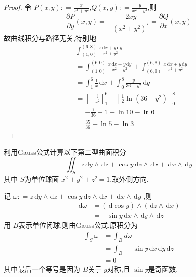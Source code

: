 \documentclass[lang=cn,12pt,color=green,fontset=none,thmcnt=section]{elegantbook}
\begin{document}
\begin{proof}
    令 $ P \left( x,y \right): = \frac{x }{x^{2}+ y^{2} }   $,$ Q \left( x,y \right): = \frac{y }{x^{2}+ y^{2} }   $,则 $$
    \frac{\partial P}{\partial y}\left( x,y \right) =  - \frac{2xy}{\left( x^{2}+ y^{2} \right)^{2} }   = \frac{\partial Q}{\partial x} \left( x,y \right)$$
    故曲线积分与路径无关,特别地 $$
    \begin{aligned}
    &\int_{\left( 1,0 \right) }^{\left( 6,8 \right) } \frac{ x\,\mathrm{d} x+ y\,\mathrm{d} y }{x^{2}+ y^{2} }  \\ 
     & =  \int_{\left( 1,0 \right) }^{\left( 6,0 \right) } \frac{x\,\mathrm{d} x+ y\,\mathrm{d} y }{x^{2}+ y^{2} }+  \int_{\left( 6,0 \right) }^{\left( 6,8 \right) } \frac{ x\,\mathrm{d} x+ y\,\mathrm{d} y }{ x^{2}+ y^{2}}  \\ 
      & = \int_{1}^{6} \frac{1}{x} \,\mathrm{d} x+  \int_{0}^{8} \frac{y}{36+ y^{2}}\,\mathrm{d} y\\ 
       & = [- \frac{1}{x^{2}}]_{1}^{6} +  \left[ \frac{1}{2} \ln \left( 36+ y^{2} \right)  \right]_{0}^{8}\\ 
        & =  - \frac{1}{36} + 1 +   \ln 10 - \ln 6\\ 
         & = \frac{35}{36} +  \ln 5-\ln 3 
    \end{aligned}
    $$
\end{proof}

\begin{exercise}
    利用Gauss公式计算以下第二型曲面积分 $$
    \iint_{S} z \,\mathrm{d} y\wedge \,\mathrm{d} z+ \cos y \,\mathrm{d} z\wedge \,\mathrm{d} x+  \,\mathrm{d} x\wedge \,\mathrm{d} y
    $$其中 $ S $为单位球面 $ x^{2}+ y^{2}+ z^{2}=1 $,取外侧方向.    
\end{exercise}

\begin{solution}
    记 $ \omega : = z\,\mathrm{d} y\wedge \,\mathrm{d} z+ \cos y\,\mathrm{d} z\wedge  \,\mathrm{d} x+ \,\mathrm{d} x\wedge \,\mathrm{d} y $ 
    ,则 $$ 
    \begin{aligned}
        \,\mathrm{d} \omega  & =  \left( \,\mathrm{d} \cos y \right) \wedge \left( \,\mathrm{d} z\wedge \,\mathrm{d} x \right) \\ 
         & =  -\sin y \,\mathrm{d} x\wedge \,\mathrm{d} y\wedge \,\mathrm{d} z
    \end{aligned}
    $$ 
    用 $ B $表示单位闭球,则由Gauss公式,原积分为 $$
   \begin{aligned}
    \int_{S} \omega & = \int_{B} d\omega \\ 
     & = \int_{B}-\sin y\,\mathrm{d} x\,\mathrm{d} y\,\mathrm{d} z\\ 
      & = 0 
   \end{aligned}
    $$ 其中最后一个等号是因为 $ B $关于 $ y $对称,且 $ \sin y $是奇函数.   
\end{solution}
\end{document}
